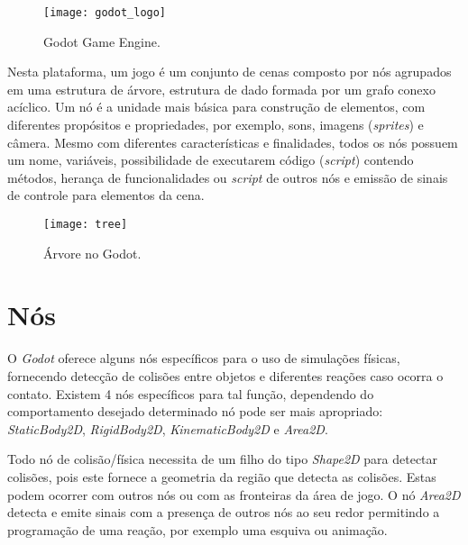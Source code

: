 
\begin{figure}[htpb]
  \centering
  \texttt{[image: godot\_logo]} 
  \caption{Godot Game Engine.\label{fig:godot-logo} \footnotemark}
\end{figure}

Nesta plataforma, um jogo é um conjunto de cenas composto por nós agrupados em uma estrutura de árvore, estrutura de dado formada por um grafo conexo acíclico. Um nó é a unidade mais básica para construção de elementos, com diferentes propósitos e propriedades, por exemplo, sons, imagens (\textit{sprites}) e câmera. Mesmo com diferentes características e finalidades, todos os nós possuem um nome, variáveis, possibilidade de executarem código (\textit{script}) contendo métodos, herança de funcionalidades ou \textit{script} de outros nós e emissão de sinais de controle para elementos da cena.

\pagebreak

\begin{figure}[htpb]
  \centering
  \texttt{[image: tree]}
  \caption{Árvore no Godot.\label{fig:godot-tree} \footnotemark}
\end{figure}


\section{Nós}
\label{sec:godot-nos}
 O \textit{Godot} oferece alguns nós específicos para o uso de simulações físicas, fornecendo detecção de colisões entre objetos e diferentes reações caso ocorra o contato. Existem 4 nós específicos para tal função, dependendo do comportamento desejado determinado nó pode ser mais apropriado: \textit{StaticBody2D},  \textit{RigidBody2D}, \textit{KinematicBody2D} e \textit{Area2D}.
 
Todo nó de colisão/física necessita de um filho do tipo \textit{Shape2D} para detectar colisões, pois este fornece a geometria da região que detecta as colisões. Estas podem ocorrer com outros nós ou com as fronteiras da área de jogo. O nó \textit{Area2D} detecta e emite sinais com a presença de outros nós ao seu redor permitindo a programação de uma reação, por exemplo uma esquiva ou animação.

